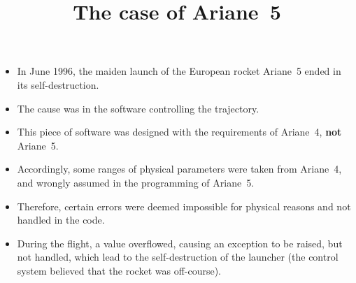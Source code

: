 \documentclass[wide]{slides}
\begin{document}
\begin{slide}
  \title{The case of Ariane~5}

  \begin{itemize}

    \item In June 1996, the maiden launch of the European rocket
      Ariane~5 ended in its self\hyp{}destruction.

    \item The cause was in the software controlling the trajectory.

    \item This piece of software was designed with the requirements of
      Ariane~4, \textbf{not} Ariane~5.

    \item Accordingly, some ranges of physical parameters were taken
      from Ariane~4, and wrongly assumed in the programming of
      Ariane~5.

    \item Therefore, certain errors were deemed impossible for
      physical reasons and not handled in the code.

    \item During the flight, a value overflowed, causing an exception
      to be raised, but not handled, which lead to the
      self\hyp{}destruction of the launcher (the control system
      believed that the rocket was off\hyp{}course).

  \end{itemize}

\end{slide}
\end{document}
